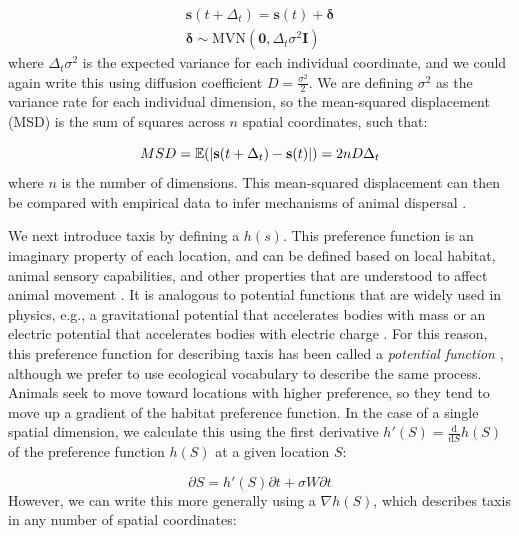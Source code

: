 \begin{equation} \label{eq:Chap4_diffusion}
\begin{gathered}
    \mathbf{s}(t+\Delta_t) = \mathbf{s}(t) + \mathbf{\delta}    \\
    \mathbf{\delta} \sim \mathrm{MVN}( \mathbf{0}, \Delta_t \sigma^2 \mathbf{I})    
\end{gathered}
\end{equation}
where \(\Delta_t \sigma^2\) is the expected variance for each individual coordinate, and we could again write this using diffusion coefficient \(D=\frac{\sigma^2}{2}\).  We are defining \(\sigma^2\) as the variance rate for each individual dimension, so the mean-squared displacement (MSD) is the sum of squares across \(n\) spatial coordinates, such that:

\begin{equation} \label{eq:Chap4_MSD}
    MSD = \E( |\mathbf{s}(t+\Delta_t) - \mathbf{s}(t)| ) = 2nD \Delta_t
\end{equation}
where \(n\) is the number of dimensions.  This mean-squared displacement can then be compared with empirical data to infer mechanisms of animal dispersal \cite{skellam_random_1951,okubo_examples_2001}.

We next introduce taxis by defining a  \( h(s) \).  This preference function is an imaginary property of each location, and can be defined based on local habitat, animal sensory capabilities, and other properties that are understood to affect animal movement \cite{nathan_movement_2008}. It is analogous to potential functions that are widely used in physics, e.g., a gravitational potential that accelerates bodies with mass or an electric potential that accelerates bodies with electric charge \cite{brillinger_learning_2012}.  For this reason, this preference function for describing taxis has been called a \textit{potential function} \cite{mcclintock_integrated_2022,preisler_modeling_2004}, although we prefer to use ecological vocabulary to describe the same process.  Animals seek to move toward locations with higher preference, so they tend to move up a gradient of the habitat preference function.  In the case of a single spatial dimension, we calculate this using the first derivative \(h'(S) = \frac{\mathrm{d}}{\mathrm{d} S}h(S) \) of the preference function \(h(S)\) at a given location \(S\):

\begin{equation} \label{eq:Chap4_1D_taxis}
  \partial S = h'(S) \partial t + \sigma W \partial t    
\end{equation}
However, we can write this more generally using a  \( \nabla h(S)\), which describes taxis in any number of spatial coordinates:

